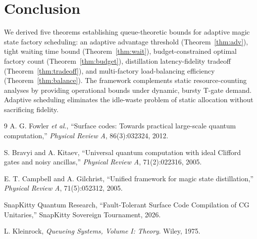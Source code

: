 \documentclass[11pt,letterpaper]{article}
\begin{document}
\section{Conclusion}
\label{sec:conc}

We derived five theorems establishing queue-theoretic bounds for adaptive magic state factory
scheduling: an adaptive advantage threshold (Theorem~\ref{thm:adv}), tight waiting time
bound (Theorem~\ref{thm:wait}), budget-constrained optimal factory count
(Theorem~\ref{thm:budget}), distillation latency-fidelity tradeoff
(Theorem~\ref{thm:tradeoff}), and multi-factory load-balancing efficiency
(Theorem~\ref{thm:balance}). The framework complements static resource-counting analyses by
providing operational bounds under dynamic, bursty T-gate demand. Adaptive scheduling
eliminates the idle-waste problem of static allocation without sacrificing fidelity.

\begin{thebibliography}{9}
A. G. Fowler \textit{et al.}, ``Surface codes: Towards practical large-scale quantum
computation,'' \textit{Physical Review A}, 86(3):032324, 2012.

S. Bravyi and A. Kitaev, ``Universal quantum computation with ideal Clifford gates and
noisy ancillas,'' \textit{Physical Review A}, 71(2):022316, 2005.

E. T. Campbell and A. Gilchrist, ``Unified framework for magic state distillation,''
\textit{Physical Review A}, 71(5):052312, 2005.

SnapKitty Quantum Research, ``Fault-Tolerant Surface Code Compilation of CG Unitaries,''
SnapKitty Sovereign Tournament, 2026.

L. Kleinrock, \textit{Queueing Systems, Volume I: Theory}. Wiley, 1975.
\end{thebibliography}
\end{document}
